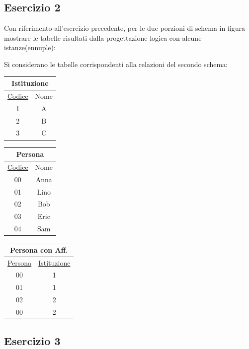 \documentclass{article}
\numberwithin{equation}{subsection}
\begin{document}
\subsection{Esercizio 2}

Con riferimento all'esercizio precedente, per le due porzioni di schema in figura mostrare le tabelle risultati dalla progettazione logica con 
alcune istanze(ennuple):


Si considerano le tabelle corrispondenti alla relazioni del secondo schema:
\begin{center}
    \begin{tabular}{|c|c|}
        \hline
        \multicolumn{2}{|c|}{Istituzione}\\
        \hline
        \underline{Codice} & Nome\\
        \hline
        1 & A\\\hline 2&B\\\hline 3&C\\\hline
    \end{tabular}
    \begin{tabular}{|c|c|}
        \hline
        \multicolumn{2}{|c|}{Persona}\\
        \hline
        \underline{Codice}& Nome\\
        \hline
        00&Anna\\\hline 01&Lino\\\hline 02&Bob\\\hline 03&Eric\\\hline 04 & Sam\\\hline
    \end{tabular}
    \begin{tabular}{|c|c|}
        \hline
        \multicolumn{2}{|c|}{Persona con Aff.}\\
        \hline
        \underline{Persona} & \underline{Istituzione}\\
        \hline
        00&1\\\hline 01 & 1\\\hline 02&2\\\hline 00&2\\\hline
    \end{tabular}
\end{center}

\subsection{Esercizio 3}
\end{document}
